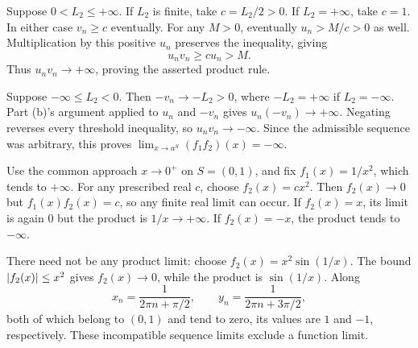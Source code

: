 Suppose $0<L_2\le+\infty$.
If $L_2$ is finite, take $c=L_2/2>0$.
If $L_2=+\infty$, take $c=1$.
In either case $v_n\ge c$ eventually.
For any $M>0$, eventually $u_n>M/c>0$ as well. Multiplication
by this positive $u_n$ preserves the inequality, giving
\[
 u_nv_n\ge cu_n>M.
\]
Thus $u_nv_n\to+\infty$, proving the asserted product rule.

Suppose $-\infty\le L_2<0$. Then $-v_n\to-L_2>0$,
where $-L_2=+\infty$ if $L_2=-\infty$.
Part (b)'s argument applied to $u_n$ and $-v_n$ gives
$u_n(-v_n)\to+\infty$.
Negating reverses every threshold inequality, so
$u_nv_n\to-\infty$. Since the admissible sequence was
arbitrary, this proves
$\lim_{x\to a^S}(f_1f_2)(x)=-\infty$.

Use the common approach $x\to0^+$ on $S=(0,1)$, and fix
$f_1(x)=1/x^2$, which tends to $+\infty$.
For any prescribed real $c$, choose $f_2(x)=cx^2$.
Then $f_2(x)\to0$ but $f_1(x)f_2(x)=c$, so any finite real
limit can occur. If $f_2(x)=x$, its limit is again $0$ but
the product is $1/x\to+\infty$.
If $f_2(x)=-x$, the product tends to $-\infty$.

There need not be any product limit: choose
$f_2(x)=x^2\sin(1/x)$. The bound $\left|f_2(x)\right|\le x^2$
gives $f_2(x)\to0$, while the product is $\sin(1/x)$.
Along
\[
 x_n=\frac1{2\pi n+\pi/2},\qquad
 y_n=\frac1{2\pi n+3\pi/2},
\]
both of which belong to $(0,1)$ and tend to zero, its values
are $1$ and $-1$, respectively. These incompatible sequence
limits exclude a function limit.
